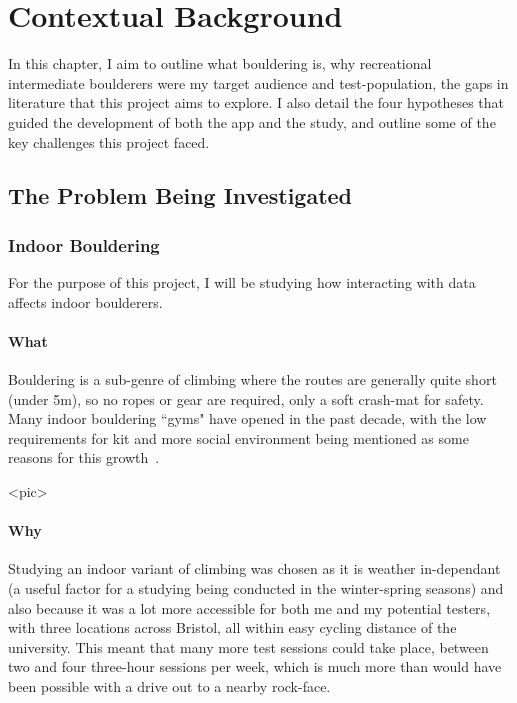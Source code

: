 \chapter{Contextual Background}
\label{chap:context}

%

In this chapter, I aim to outline what bouldering is, why recreational intermediate boulderers were my target audience and test-population, the gaps in literature that this project aims to explore.
I also detail the four hypotheses that guided the development of both the app and the study, and outline some of the key challenges this project faced.

\section{The Problem Being Investigated}
\subsection{Indoor Bouldering}
For the purpose of this project, I will be studying how interacting with data affects indoor boulderers.

\subsubsection{What}
Bouldering is a sub-genre of climbing where the routes are generally quite short (under 5m), so no ropes or gear are required, only a soft crash-mat for safety.
Many indoor bouldering ``gyms" have opened in the past decade, with the low requirements for kit and more social environment being mentioned as some reasons for this growth~\cite{socialclimb}.

<pic>
\subsubsection{Why}
Studying an indoor variant of climbing was chosen as it is weather in-dependant (a useful factor for a studying being conducted in the winter-spring seasons) and also because it was a lot more accessible for both me and my potential testers, with three locations across Bristol, all within easy cycling distance of the university.
This meant that many more test sessions could take place, between two and four three-hour sessions per week, which is much more than would have been possible with a drive out to a nearby rock-face.

